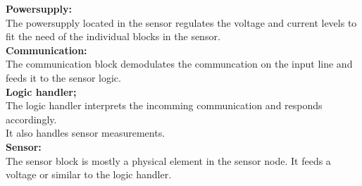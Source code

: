\textbf{Powersupply:}\\
The powersupply located in the sensor regulates the voltage and current levels to fit the need of the individual blocks in the sensor.\\

\textbf{Communication:}\\
The communication block demodulates the communcation on the input line and feeds it to the sensor logic.\\

\textbf{Logic handler;}\\
The logic handler interprets the incomming communication and responds accordingly.\\
It also handles sensor measurements.\\

\textbf{Sensor:}\\
The sensor block is mostly a physical element in the sensor node. It feeds a voltage or similar to the logic handler.\\



